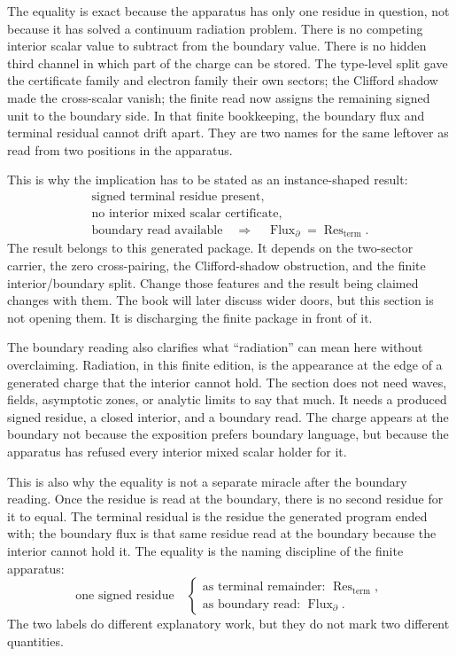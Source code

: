 The equality is exact because the apparatus has only one residue in question,
not because it has solved a continuum radiation problem. There is no competing
interior scalar value to subtract from the boundary value. There is no hidden
third channel in which part of the charge can be stored. The type-level split
gave the certificate family and electron family their own sectors; the
Clifford shadow made the cross-scalar vanish; the finite read now assigns the
remaining signed unit to the boundary side. In that finite bookkeeping, the
boundary flux and terminal residual cannot drift apart. They are two names for
the same leftover as read from two positions in the apparatus.

This is why the implication has to be stated as an instance-shaped result:
\[
\begin{gathered}
  \text{signed terminal residue present},\\
  \text{no interior mixed scalar certificate},\\
  \text{boundary read available}
  \quad\Longrightarrow\quad
  \operatorname{Flux}_{\partial}
  =
  \operatorname{Res}_{\mathrm{term}}.
\end{gathered}
\]
The result belongs to this generated package. It depends on the two-sector
carrier, the zero cross-pairing, the Clifford-shadow obstruction, and the
finite interior/boundary split. Change those features and the result being
claimed changes with them. The book will later discuss wider doors, but this
section is not opening them. It is discharging the finite package in front of
it.

The boundary reading also clarifies what ``radiation'' can mean here without
overclaiming. Radiation, in this finite edition, is the appearance at the edge
of a generated charge that the interior cannot hold. The section does not need
waves, fields, asymptotic zones, or analytic limits to say that much. It needs
a produced signed residue, a closed interior, and a boundary read. The charge
appears at the boundary not because the exposition prefers boundary language,
but because the apparatus has refused every interior mixed scalar holder for
it.

This is also why the equality is not a separate miracle after the boundary
reading. Once the residue is read at the boundary, there is no second residue
for it to equal. The terminal residual is the residue the generated program
ended with; the boundary flux is that same residue read at the boundary because
the interior cannot hold it. The equality is the naming discipline of the
finite apparatus:
\[
  \text{one signed residue}
  \quad
  \begin{cases}
    \text{as terminal remainder: } \operatorname{Res}_{\mathrm{term}},\\
    \text{as boundary read: } \operatorname{Flux}_{\partial}.
  \end{cases}
\]
The two labels do different explanatory work, but they do not mark two
different quantities.

